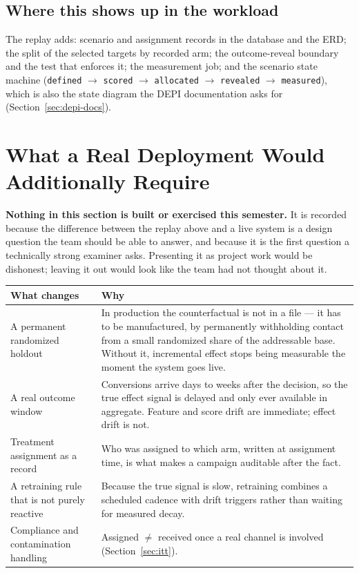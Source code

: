 \documentclass[11pt,a4paper]{article}
\begin{document}
\subsection{Where this shows up in the workload}

The replay adds: scenario and assignment records in the database and the ERD; the split of the
selected targets by recorded arm; the outcome-reveal boundary and the test that enforces it; the measurement job; and the
scenario state machine (\texttt{defined} $\to$ \texttt{scored} $\to$ \texttt{allocated} $\to$
\texttt{revealed} $\to$ \texttt{measured}), which is also the state diagram the DEPI documentation
asks for (Section~\ref{sec:depi-docs}).

\section{What a Real Deployment Would Additionally Require}
\label{sec:deployment-gap}

\begin{keybox}
\textbf{Nothing in this section is built or exercised this semester.} It is recorded because the
difference between the replay above and a live system is a design question the team should be able
to answer, and because it is the first question a technically strong examiner asks. Presenting it
as project work would be dishonest; leaving it out would look like the team had not thought about it.
\end{keybox}

\begin{tabularx}{\textwidth}{@{}L{4.2cm}X@{}}
\toprule
\textbf{What changes} & \textbf{Why} \\
\midrule
A permanent randomized holdout & In production the counterfactual is not in a file --- it has to be
manufactured, by permanently withholding contact from a small randomized share of the addressable
base. Without it, incremental effect stops being measurable the moment the system goes live. \\
A real outcome window & Conversions arrive days to weeks after the decision, so the true effect
signal is delayed and only ever available in aggregate. Feature and score drift are immediate;
effect drift is not. \\
Treatment assignment as a record & Who was assigned to which arm, written at assignment time, is
what makes a campaign auditable after the fact. \\
A retraining rule that is not purely reactive & Because the true signal is slow, retraining combines
a scheduled cadence with drift triggers rather than waiting for measured decay. \\
Compliance and contamination handling & Assigned $\neq$ received once a real channel is involved
(Section~\ref{sec:itt}). \\
\bottomrule
\end{tabularx}
\end{document}
